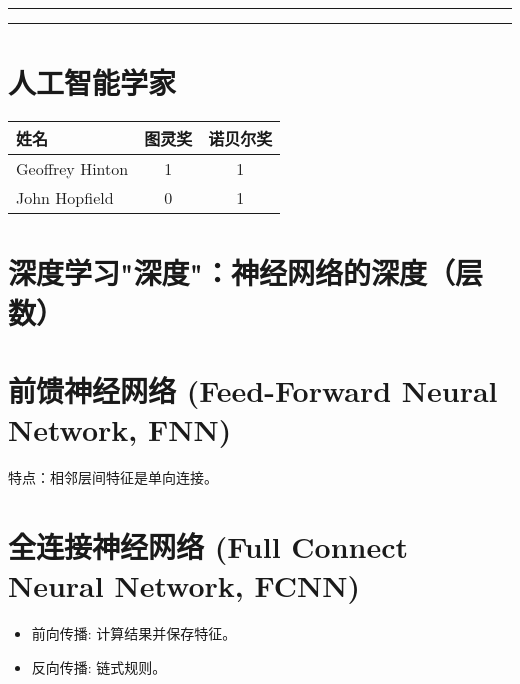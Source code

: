 \documentclass[
12pt, %
a4paper, 
oneside, %
headinclude,footinclude, %
]{scrartcl}
\title{\normalfont\spacedallcaps{深度学习}}
\date{}
\begin{document}
\maketitle
\newpage
\hypertarget{toc}{}
\begingroup
\begin{multicols}{2}
\tableofcontents
\end{multicols}
\endgroup
\newpage
\begingroup
\begin{multicols}{2}
\listoffigures
\end{multicols}
\endgroup
\hrule
\begingroup
\begin{multicols}{2}
\listoftables
\end{multicols}
\endgroup
\hrule
\listoftips
\newpage
\section{人工智能学家}
\begin{table}[h]
\centering
\begin{tabular}{|l|c|c|}
\hline
姓名 & 图灵奖 & 诺贝尔奖 \\
\hline
Geoffrey Hinton & 1 & 1 \\
\hline
John Hopfield & 0 & 1 \\
\hline
\end{tabular}
\end{table}

\section{深度学习"深度"：神经网络的深度（层数）}

\section{前馈神经网络 (Feed-Forward Neural Network, FNN)}
特点：相邻层间特征是单向连接。

\section{全连接神经网络 (Full Connect Neural Network, FCNN)}
\begin{itemize}
\item 前向传播: 计算结果并保存特征。
\item 反向传播: 链式规则。
\end{itemize}
\end{document}
